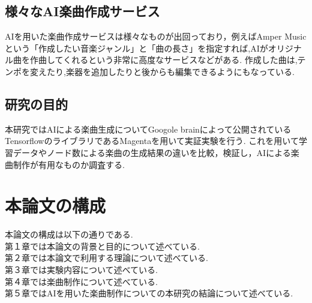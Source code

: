 \subsection{様々なAI楽曲作成サービス}
AIを用いた楽曲作成サービスは様々なものが出回っており，例えばAmper Musicという「作成したい音楽ジャンル」と「曲の長さ」を指定すれば,AIがオリジナル曲を作曲してくれるという非常に高度なサービスなどがある. 作成した曲は,テンポを変えたり,楽器を追加したりと後からも編集できるようにもなっている.\\
\subsection{研究の目的}
本研究ではAIによる楽曲生成についてGoogole brainによって公開されているTensorflowのライブラリであるMagentaを用いて実証実験を行う.
これを用いて学習データやノード数による楽曲の生成結果の違いを比較，検証し，AIによる楽曲制作が有用なものか調査する.\\
\section{本論文の構成}
本論文の構成は以下の通りである.\\
第１章では本論文の背景と目的について述べている.\\
第２章では本論文で利用する理論について述べている.\\
第３章では実験内容について述べている.\\
第４章では楽曲制作について述べている.\\
第５章ではAIを用いた楽曲制作についての本研究の結論について述べている.\\